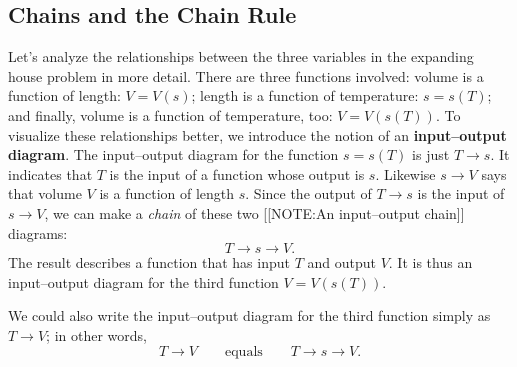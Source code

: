 \subsection{Chains and the Chain Rule}
\label{subsec:chains-and-the-chain-rule}

Let's analyze the relationships between the three variables in the
expanding house problem in more detail.  There are three functions
involved: volume is a function of length: $V = V(s)$; length is a
function of temperature: $s = s(T)$; and finally, volume is a function
of temperature, too: $V = V(s(T))$.  To visualize these relationships
better, we introduce the notion of an {\bf input--output
  diagram}. The input--output diagram for
the function $s = s(T)$ is just $T \to s$.  It indicates that $T$ is
the input of a function whose output is $s$.  Likewise $s \to V$ says
that volume $V$ is a function of length $s$.  Since the output of $T
\to s$ is the input of $s \to V$, we can make a {\em chain\/} of these
two
	[[NOTE:An input--output chain]]
diagrams:
	\[
T \longrightarrow s \longrightarrow V.
\]
The result describes a function that has input $T$ and output $V$.  It
is thus an input--output diagram for the third function $V = V(s(T))$.

We could also write the input--output diagram for the third function
simply as $T \to V$; in other words,
	\[
T \longrightarrow V \qquad \mbox{equals} \qquad 
		T \longrightarrow s \longrightarrow V.
\]




